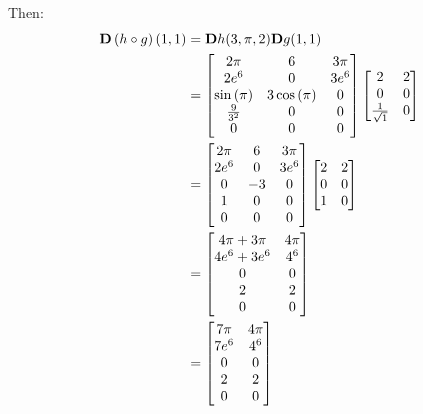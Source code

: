 \begin{solution}
    Then:
    \begin{align*}
        \vb{D}\left(h \circ g\right)(1, 1) &= \vb{D}h(3, \pi, 2) \vb{D}g(1, 1) \\
        &= 
        \begin{bmatrix}
            2\pi & 6 & 3\pi \\
            2e^6 & 0 & 3e^6 \\
            \sin{(\pi)} & 3\cos{(\pi)} & 0 \\
            \frac{9}{3^2} & 0 & 0 \\
            0 & 0 & 0
        \end{bmatrix}
        \begin{bmatrix}
            2 & 2 \\
            0 & 0 \\
            \frac{1}{\sqrt{1}} & 0
        \end{bmatrix} \\
        &= 
        \begin{bmatrix}
            2\pi & 6 & 3\pi \\
            2e^6 & 0 & 3e^6 \\
            0 & -3 & 0 \\
            1 & 0 & 0 \\
            0 & 0 & 0
        \end{bmatrix}
        \begin{bmatrix}
            2 & 2 \\
            0 & 0 \\
            1 & 0
        \end{bmatrix} \\
        &= 
        \begin{bmatrix}
            4\pi + 3\pi & 4\pi \\
            4e^6 + 3e^6 & 4^6 \\
            0 & 0 \\
            2 & 2 \\
            0 & 0
        \end{bmatrix} \\
        &= 
        \begin{bmatrix}
            7\pi & 4\pi \\
            7e^6 & 4^6 \\
            0 & 0 \\
            2 & 2 \\
            0 & 0
        \end{bmatrix}
    \end{align*}
\end{solution}

